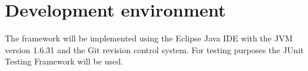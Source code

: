 \section{Development environment}

The framework will be implemented using the Eclipse Java IDE with the JVM version 1.6.31 and the Git revision control system. For testing purposes the JUnit Testing Framework will be used.
